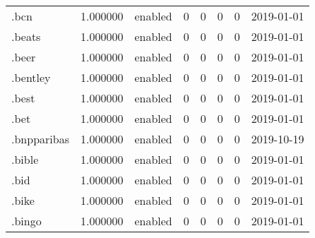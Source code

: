 \begin{tabular}{lrlrrrrl}
.bcn                      &          1.000000 &         enabled &                           0 &                           0 &                           0 &                   0 &           2019-01-01 \\
.beats                    &          1.000000 &         enabled &                           0 &                           0 &                           0 &                   0 &           2019-01-01 \\
.beer                     &          1.000000 &         enabled &                           0 &                           0 &                           0 &                   0 &           2019-01-01 \\
.bentley                  &          1.000000 &         enabled &                           0 &                           0 &                           0 &                   0 &           2019-01-01 \\
.best                     &          1.000000 &         enabled &                           0 &                           0 &                           0 &                   0 &           2019-01-01 \\
.bet                      &          1.000000 &         enabled &                           0 &                           0 &                           0 &                   0 &           2019-01-01 \\
.bnpparibas               &          1.000000 &         enabled &                           0 &                           0 &                           0 &                   0 &           2019-10-19 \\
.bible                    &          1.000000 &         enabled &                           0 &                           0 &                           0 &                   0 &           2019-01-01 \\
.bid                      &          1.000000 &         enabled &                           0 &                           0 &                           0 &                   0 &           2019-01-01 \\
.bike                     &          1.000000 &         enabled &                           0 &                           0 &                           0 &                   0 &           2019-01-01 \\
.bingo                    &          1.000000 &         enabled &                           0 &                           0 &                           0 &                   0 &           2019-01-01 \\

\end{tabular}
